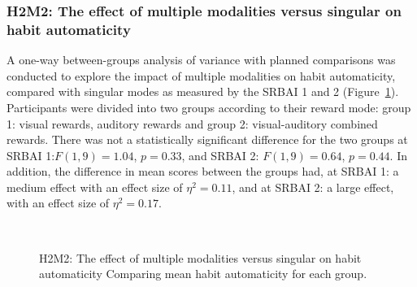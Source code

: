 \subsubsection*{H2M2: The effect of multiple modalities versus singular on habit automaticity}
A one-way between-groups analysis of variance with planned comparisons was conducted to explore the
impact of multiple modalities on habit automaticity, compared with singular modes as measured by the SRBAI 1 and 2 (Figure~\ref{fig:m2_h2}). Participants were divided into two groups according to their reward mode: group 1: visual rewards, auditory rewards and group 2: visual-auditory combined rewards. There was not a
statistically significant difference for the two groups at SRBAI 1:$ F(1,9) = 1.04$, $p = 0.33$, and SRBAI 2: $F(1,9) = 0.64$, $p = 0.44$. In addition, the difference in mean scores between the groups had, at SRBAI 1: a medium effect with an effect size of $\eta^{2} = 0.11$, and at SRBAI 2: a large effect, with an effect size of $\eta^{2} = 0.17$.


\begin{figure}[H]
  \centering
  \caption{H2M2: The effect of multiple modalities versus singular on habit automaticity Comparing mean habit automaticity for each group.}~\label{fig:m2_h2}
\end{figure}


